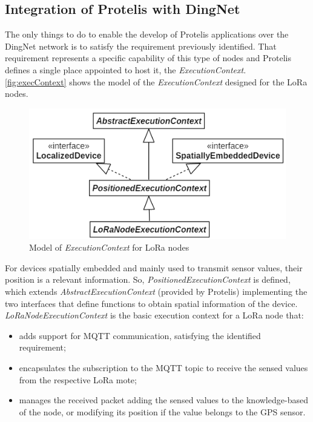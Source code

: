 \subsection{Integration of Protelis with DingNet}
\label{sec:PoverD}
The only things to do to enable the develop of Protelis applications over the DingNet network is to satisfy the requirement previously identified.
That requirement represents a specific capability of this type of nodes and Protelis defines a single place appointed to host it, the \mbox{\textit{ExecutionContext}}.
\autoref{fig:execContext} shows the model of the \mbox{\textit{ExecutionContext}} designed for the LoRa nodes. 
\begin{figure}[H]
    \centering
    \includegraphics{figures/execContext.png}
    \caption{Model of \textit{ExecutionContext} for LoRa nodes}
    \label{fig:execContext}
\end{figure}
\noindent For devices spatially embedded and mainly used to transmit sensor values, their position is a relevant information. So, \mbox{\textit{PositionedExecutionContext}} is defined, which extends \mbox{\textit{AbstractExecutionContext}} (provided by Protelis) implementing the two interfaces that define functions to obtain spatial information of the device.
\mbox{\textit{LoRaNodeExecutionContext}} is the basic execution context for a LoRa node that:
% 
\begin{itemize}
    \item adds support for MQTT communication, satisfying the identified requirement;
    \item encapsulates the subscription to the MQTT topic to receive the sensed values from the respective LoRa mote;
    \item manages the received packet adding the sensed values to the knowledge-based of the node, or modifying its position if the value belongs to the GPS sensor.
\end{itemize}
